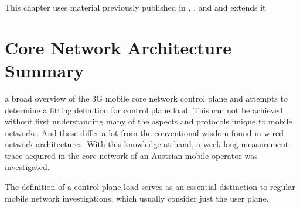 This chapter uses material previously published in \cite{metzger2012research}, \cite{metzger2014jcnc}, and \cite{metzger2014lossmodel} and extends it.













\section{Core Network Architecture Summary}
\label{c41:sec:conclusion}

 a broad overview of the \gls{3G} mobile core network control plane and attempts to determine a fitting definition for control plane load. This can not be achieved without first understanding many of the aspects and protocols unique to mobile networks. And these differ a lot from the conventional wisdom found in wired network architectures. With this knowledge at hand, a week long measurement trace acquired in the core network of an Austrian mobile operator was investigated. 

The definition of a control plane load serves as an essential distinction to regular mobile network investigations, which usually consider just the user plane.